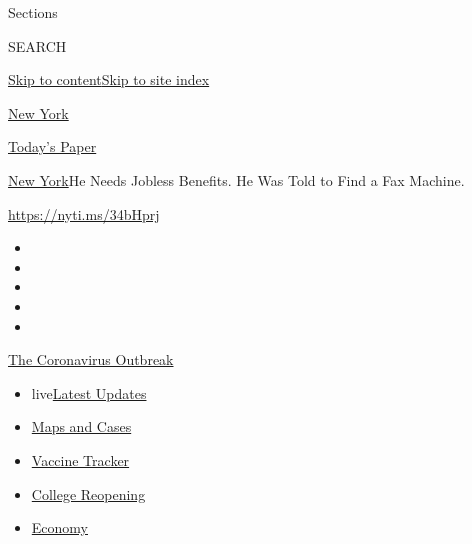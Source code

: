 Sections

SEARCH

\protect\hyperlink{site-content}{Skip to
content}\protect\hyperlink{site-index}{Skip to site index}

\href{https://www.nytimes.com/section/nyregion}{New York}

\href{https://myaccount.nytimes.com/auth/login?response_type=cookie\&client_id=vi}{}

\href{https://www.nytimes.com/section/todayspaper}{Today's Paper}

\href{/section/nyregion}{New York}\textbar{}He Needs Jobless Benefits.
He Was Told to Find a Fax Machine.

\url{https://nyti.ms/34bHprj}

\begin{itemize}
\item
\item
\item
\item
\item
\end{itemize}

\href{https://www.nytimes.com/news-event/coronavirus?action=click\&pgtype=Article\&state=default\&region=TOP_BANNER\&context=storylines_menu}{The
Coronavirus Outbreak}

\begin{itemize}
\tightlist
\item
  live\href{https://www.nytimes.com/2020/08/04/world/coronavirus-cases.html?action=click\&pgtype=Article\&state=default\&region=TOP_BANNER\&context=storylines_menu}{Latest
  Updates}
\item
  \href{https://www.nytimes.com/interactive/2020/us/coronavirus-us-cases.html?action=click\&pgtype=Article\&state=default\&region=TOP_BANNER\&context=storylines_menu}{Maps
  and Cases}
\item
  \href{https://www.nytimes.com/interactive/2020/science/coronavirus-vaccine-tracker.html?action=click\&pgtype=Article\&state=default\&region=TOP_BANNER\&context=storylines_menu}{Vaccine
  Tracker}
\item
  \href{https://www.nytimes.com/2020/08/02/us/covid-college-reopening.html?action=click\&pgtype=Article\&state=default\&region=TOP_BANNER\&context=storylines_menu}{College
  Reopening}
\item
  \href{https://www.nytimes.com/live/2020/08/04/business/stock-market-today-coronavirus?action=click\&pgtype=Article\&state=default\&region=TOP_BANNER\&context=storylines_menu}{Economy}
\end{itemize}

